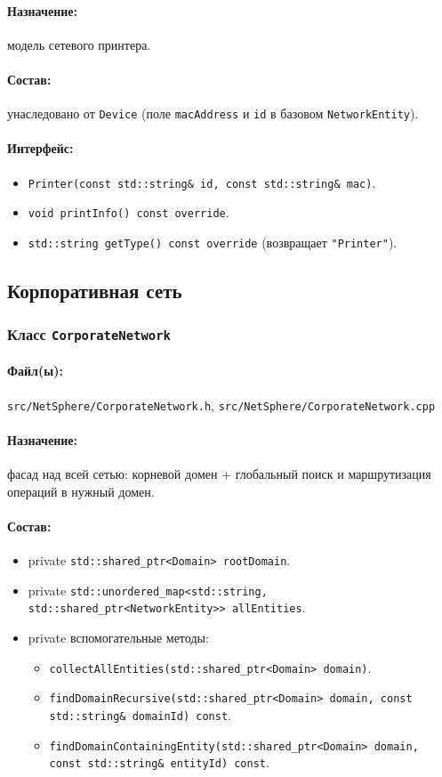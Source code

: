 \documentclass[14pt,a4paper]{extarticle}
\begin{document}
\paragraph{Назначение:} модель сетевого принтера.
\paragraph{Состав:}
унаследовано от \texttt{Device} (поле \texttt{macAddress} и \texttt{id} в базовом \texttt{NetworkEntity}).
\paragraph{Интерфейс:}
\begin{itemize}
  \item \texttt{Printer(const std::string\& id, const std::string\& mac)}.
  \item \texttt{void printInfo() const override}.
  \item \texttt{std::string getType() const override} (возвращает \texttt{"Printer"}).
\end{itemize}

\subsection{Корпоративная сеть}
\subsubsection{Класс \texttt{CorporateNetwork}}
\paragraph{Файл(ы):} \texttt{src/NetSphere/CorporateNetwork.h}, \texttt{src/NetSphere/CorporateNetwork.cpp}
\paragraph{Назначение:} фасад над всей сетью: корневой домен + глобальный поиск и маршрутизация операций в нужный домен.
\paragraph{Состав:}
\begin{itemize}
  \item private \texttt{std::shared\_ptr<Domain> rootDomain}.
  \item private \texttt{std::unordered\_map<std::string, std::shared\_ptr<NetworkEntity>> allEntities}.
  \item private вспомогательные методы:
  \begin{itemize}
    \item \texttt{collectAllEntities(std::shared\_ptr<Domain> domain)}.
    \item \texttt{findDomainRecursive(std::shared\_ptr<Domain> domain, const std::string\& domainId) const}.
    \item \texttt{findDomainContainingEntity(std::shared\_ptr<Domain> domain, const std::string\& entityId) const}.
  \end{itemize}
\end{itemize}
\end{document}
